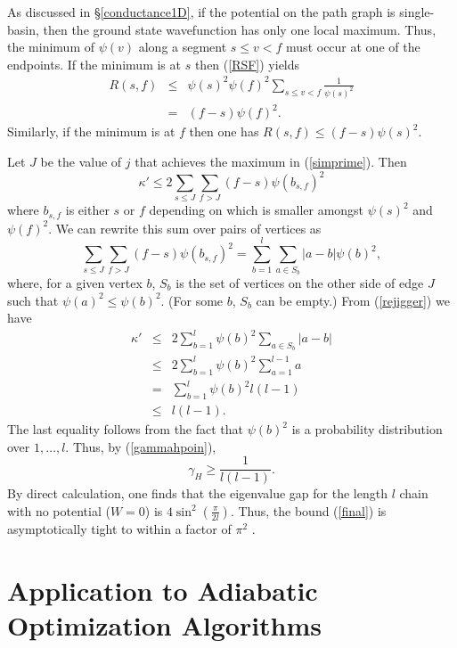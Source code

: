 As discussed in \S \ref{conductance1D}, if the potential on the
path graph is single-basin, then the ground state wavefunction has only one
local maximum. Thus, the minimum of $\psi(v)$ along a segment $s \leq
v < f$ must occur at one of the endpoints. If the minimum is at $s$
then (\ref{RSF}) yields
\begin{eqnarray}
R(s,f) & \leq & \psi(s)^2 \psi(f)^2 \sum_{s \leq v < f}
\frac{1}{\psi(s)^2} \\
& = & (f-s) \psi(f)^2.
\end{eqnarray}
Similarly, if the minimum is at $f$ then one has $R(s,f) \leq (f-s)
\psi(s)^2$.

Let $J$ be the value of $j$ that achieves the maximum in
(\ref{simprime}). Then
\begin{equation}
\kappa' \leq 2 \sum_{s \leq J} \sum_{f > J}  (f-s) \psi(b_{s,f})^2
\end{equation}
where $b_{s,f}$ is either $s$ or $f$ depending on which is smaller amongst
$\psi(s)^2$ and $\psi(f)^2$. We can rewrite this sum over pairs of
vertices as
\begin{equation}
\label{rejigger}
\sum_{s \leq J} \sum_{f > J}  (f-s) \psi(b_{s,f})^2 = \sum_{b=1}^l
\sum_{a \in S_b} |a-b| \psi(b)^2,
\end{equation}
where, for a given vertex $b$, $S_b$ is the set of
vertices on the other side of edge $J$ such that $\psi(a)^2 \leq
\psi(b)^2$. (For some $b$, $S_b$ can be empty.) From (\ref{rejigger})
we have
\begin{eqnarray}
\kappa' & \leq & 2 \sum_{b=1}^l \psi(b)^2 \sum_{a \in S_b} |a-b| \\
        & \leq & 2 \sum_{b=1}^l \psi(b)^2 \sum_{a=1}^{l-1} a \\
        & =    & \sum_{b=1}^l \psi(b)^2 l(l-1) \\
        & \leq & l (l-1).
\end{eqnarray}
The last equality follows from the fact that $\psi(b)^2$ is a
probability distribution over $1,\ldots,l$. Thus, by
(\ref{gammahpoin}),
\begin{equation}
\label{final}
\gamma_H \geq \frac{1}{l(l-1)}.
\end{equation}
By direct calculation, one finds that the eigenvalue gap for the
length $l$ chain with no potential ($W=0$) is $4 \sin^2 \left(
  \frac{\pi}{2 l} \right)$. Thus, the bound (\ref{final}) is
asymptotically tight to within a factor of $\pi^2$
\cite{Jarret_Jordan}.

\section{Application to Adiabatic Optimization Algorithms}
\label{aqc}


